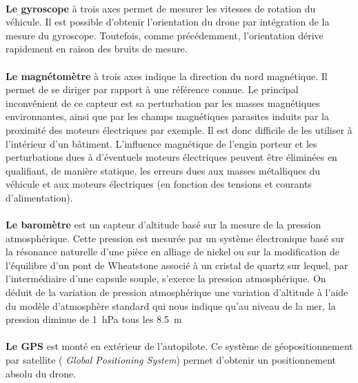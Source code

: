  \paragraph*{}
 \textbf{Le gyroscope} à trois axes permet de mesurer les vitesses de rotation du véhicule. Il est possible d'obtenir l'orientation du drone par intégration de la mesure du gyroscope. Toutefois, comme précédemment, l'orientation dérive rapidement en raison des bruits de mesure.

 \paragraph*{}
 \textbf{Le magnétomètre} à trois axes indique la direction du nord magnétique. Il permet de se diriger par rapport à une référence connue. Le principal inconvénient de ce capteur est sa perturbation par les masses magnétiques environnantes, ainsi que par les champs magnétiques parasites induits par la proximité des moteurs électriques par exemple. Il est donc difficile de les utiliser à l'intérieur d'un bâtiment. L'influence magnétique de l'engin porteur et les perturbations dues à d'éventuels moteurs électriques peuvent être éliminées en qualifiant, de manière statique, les erreurs dues aux masses métalliques du véhicule et aux moteurs électriques (en fonction des tensions et courants d'alimentation).

 \paragraph*{}

 \textbf{Le baromètre} est un capteur d'altitude basé sur la mesure de la pression atmosphérique. Cette pression est mesurée par un système électronique basé sur la résonance naturelle d'une pièce en alliage de nickel ou sur la modification de l'équilibre d'un pont de Wheatstone associé à un cristal de quartz sur lequel, par l'intermédiaire d'une capsule souple, s'exerce la pression atmosphérique. On déduit de la variation de pression atmosphérique une variation d'altitude à l'aide du modèle d'atmosphère standard qui nous indique qu'au niveau de la mer, la pression diminue de \SI{1}{\hecto\pascal} tous les \SI{8.5}{\meter}
 

 \paragraph*{}
 \textbf{Le GPS} est monté en extérieur de l'autopilote. Ce système de géopositionnement par satellite (\textit{ Global Positioning System})  permet d'obtenir un positionnement absolu du drone. 


